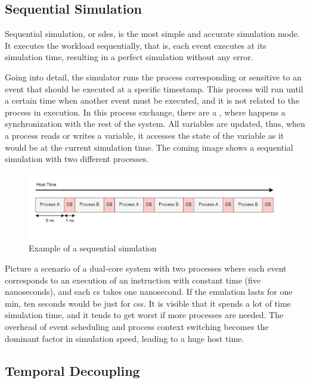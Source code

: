 \subsection{Sequential Simulation}

Sequential simulation, or \gls{sdes}, is the most simple and accurate simulation mode. It executes the workload sequentially, that is, each event executes at its simulation time, resulting in a perfect simulation without any error. 

Going into detail, the simulator runs the process corresponding or sensitive to an event that should be executed at a specific timestamp. This process will run until a certain time when another event must be executed, and it is not related to the process in execution. In this process exchange, there are a , where happens a synchronization with the rest of the system. All variables are updated, thus, when a process reads or writes a variable, it accesses the state of the variable as it would be at the current simulation time. The coming image shows a sequential simulation with two different processes.

\begin{figure}[H]
	\centering
 	\includegraphics[width=0.8\linewidth]{Images/SequentialSimulation.png}
 	\caption{Example of a sequential simulation}
	 \label{fig_SequentialSimulation}
\end{figure}

Picture a scenario of a dual-core system with two processes where each event corresponds to an execution of an instruction with constant time (five nanoseconds), and each \gls{cs} takes one nanosecond. If the emulation lasts for one min, ten seconds would be just for \glspl{cs}. It is visible that it spends a lot of time simulation time, and it tends to get worst if more processes are needed. The overhead of event scheduling and process context switching becomes the dominant factor in simulation speed, leading to a huge host time.

\subsection{Temporal Decoupling}

